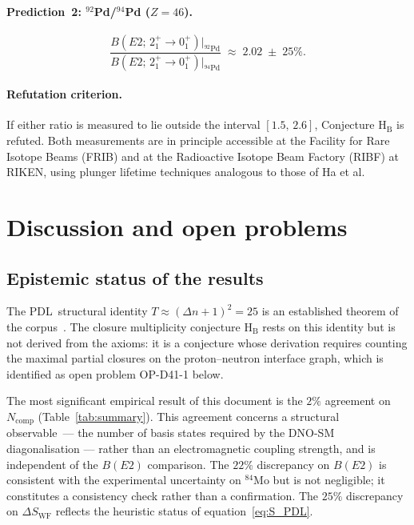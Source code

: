 \documentclass[11pt,a4paper]{article}
\theoremstyle{definition}
\newcommand{\PDL}{\textnormal{PDL}}
\newcommand{\Dn}{\Delta n}
\newcommand{\Ncomp}{N_{\mathrm{comp}}}
\newcommand{\Swf}{S_{\mathrm{WF}}}
\newcommand{\BE}[1]{B(E2;\,{2^+_1}\!\to\!{0^+_1})\big|_{#1}}
\newcommand{\Tpdl}{T}
\begin{document}
\paragraph{Prediction~2: $^{92}$Pd/$^{94}$Pd ($Z=46$).}
\begin{equation}
  \frac{\BE{^{92}\text{Pd}}}{\BE{^{94}\text{Pd}}}
  \;\approx\; 2.02 \;\pm\; 25\%.
  \label{eq:pred_Pd}
\end{equation}

\paragraph{Refutation criterion.}
If either ratio is measured to lie outside the interval $[1.5,\,2.6]$,
Conjecture H$_\mathrm{B}$ is refuted. Both measurements are in principle
accessible at the Facility for Rare Isotope Beams (FRIB) and at the
Radioactive Isotope Beam Factory (RIBF) at RIKEN, using plunger lifetime
techniques analogous to those of Ha et al.

\section{Discussion and open problems}
\label{sec:discussion}

\subsection{Epistemic status of the results}

The \PDL\ structural identity $\Tpdl \approx (\Dn+1)^2 = 25$ is an
established theorem of the corpus~\cite{PDL_D22_2026,PDL_D40_2026}.
The closure multiplicity conjecture H$_\mathrm{B}$ rests on this identity
but is not derived from the axioms: it is a conjecture whose derivation
requires counting the maximal partial closures on the proton--neutron
interface graph, which is identified as open problem OP-D41-1 below.

The most significant empirical result of this document is the $2\%$
agreement on $\Ncomp$ (Table~\ref{tab:summary}). This agreement concerns a
structural observable~--- the number of basis states required by the
DNO-SM diagonalisation --- rather than an electromagnetic coupling strength,
and is independent of the $B(E2)$ comparison.
The $22\%$ discrepancy on $B(E2)$ is consistent with the experimental
uncertainty on $^{84}$Mo but is not negligible; it constitutes a consistency
check rather than a confirmation. The $25\%$ discrepancy on $\Delta\Swf$
reflects the heuristic status of equation~\eqref{eq:S_PDL}.
\end{document}
